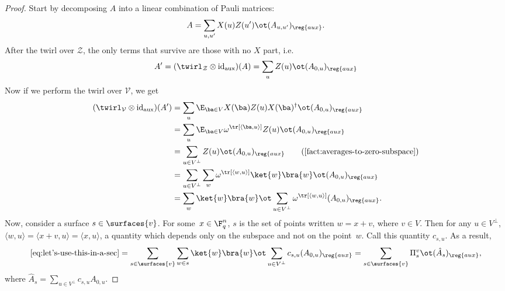   \begin{proof}
    Start by decomposing $A$ into a linear combination of Pauli
    matrices:
    \[ A = \sum_{u,u'}  X(u) Z(u') \ot (A_{u,u'})_{\reg{aux}}. \]
    After the twirl over $\mathcal{Z}$, the only terms that survive
    are those with no $X$ part, i.e.
    \[ A' = (\twirl_{\mathcal{Z}} \otimes \mathrm{id}_{\mathrm{aux}})(A) = \sum_{u} Z(u) \ot (A_{0,u})_{\reg{aux}} \]
    Now if we perform the twirl over $\mathcal{V}$, we get
    \begin{align}
      (\twirl_{\mathcal{V}} \otimes \mathrm{id}_{\mathrm{aux}})(A')
      				&= \sum_u \E_{\ba \in V} X(\ba) Z(u) X(\ba)^\dagger \ot (A_{0,u})_{\reg{aux}}\nonumber\\
      				&= \sum_u  \E_{\ba \in V} \omega^{\tr[\langle
                                 \ba, u \rangle]} Z(u) \ot (A_{0,u})_{\reg{aux}}\nonumber \\
                               &= \sum_{u \in V^\perp}  Z(u) \ot (A_{0,u})_{\reg{aux}}\tag{\Cref{fact:averages-to-zero-subspace}}\nonumber\\
                               &= \sum_{u \in V^\perp}  \sum_{w} \omega^{\tr[\langle w, u\rangle]} \ket{w}\bra{w}  \ot (A_{0,u})_{\reg{aux}} \nonumber\\
                               &= \sum_{w}\ket{w}\bra{w}\ot \sum_{u \in V^\perp}  \omega^{\tr[\langle w, u\rangle]}    (A_{0,u})_{\reg{aux}}.\label{eq:let's-use-this-in-a-sec}
    \end{align}
    Now, consider a surface $s \in \surfaces{v}$.  For some~$x \in \F_q^n$,
    $s$ is the set of points written $w = x + v$, where $v \in V$.
    Then for any $u \in V^\perp$, $\langle w, u\rangle = \langle x + v, u \rangle = \langle x, u\rangle$,
    a quantity which depends only on the subspace and not on the point~$w$.
    Call this quantity $c_{s, u}$.
    As a result,
    \begin{equation*}
    \eqref{eq:let's-use-this-in-a-sec}
    = \sum_{s \in \surfaces{v}} \sum_{w \in s} \ket{w}\bra{w}\ot  \sum_{u \in V^\perp}c_{s, u} (A_{0,u})_{\reg{aux}}
    = \sum_{s \in \surfaces{v}} \Pi^{v}_{s} \ot (\hat{A}_s)_{\reg{aux}},
    \end{equation*}
    where $\hat{A}_s = \sum_{u \in V^\perp}c_{s, u} A_{0,u}$.
  \end{proof}
  
